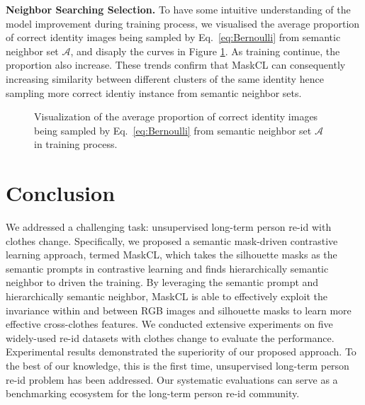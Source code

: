 \documentclass[10pt,twocolumn,letterpaper]{article}
\newcommand{\reid}{re-id}
\newcommand{\myparagraph}[1]{\noindent\textbf{#1.}}
\def\A{\mathcal{A}}
\begin{document}
{ 
\myparagraph{Neighbor Searching Selection}
To have some intuitive understanding of the model improvement during training process, 
we visualised the average proportion of correct identity images being sampled by Eq.~\eqref{eq:Bernoulli} from semantic neighbor set $\A$, and disaply the curves in Figure \ref{fig:benulisample}. 
As training continue, the proportion also increase. These trends confirm that MaskCL can consequently increasing similarity between different clusters of the same identity hence sampling more correct identiy instance from semantic neighbor sets.


    \begin{figure}[!htb]
        \begin{center}
        \footnotesize
        \end{center}
        \vspace{-6pt}
        \caption{ Visualization of the average proportion of correct identity images being sampled by Eq.~\eqref{eq:Bernoulli} from semantic neighbor set $\A$ in training process.}
        \label{fig:benulisample}
        \vspace{-10pt}
        \end{figure}   






\section{Conclusion}
\vspace{-5pt}


We addressed a challenging task: unsupervised long-term person \reid{} with clothes change. Specifically, we proposed a semantic mask-driven contrastive learning approach, termed MaskCL, which takes the silhouette masks as the semantic prompts in contrastive learning and finds hierarchically semantic neighbor to driven the training. 
By leveraging the semantic prompt and hierarchically semantic neighbor, MaskCL is able to effectively exploit the invariance within and between RGB images and silhouette masks to learn more effective cross-clothes features. We conducted extensive experiments on five widely-used
re-id datasets with clothes change to evaluate the performance. Experimental results demonstrated the superiority of our proposed approach. To the best of our knowledge, this is the first time, unsupervised long-term person \reid{} problem has been addressed. Our systematic evaluations can serve as a benchmarking ecosystem for the long-term person re-id community.










}
\end{document}

